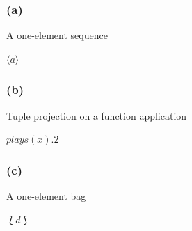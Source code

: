 \documentclass[a4paper,10pt,fleqn]{article}
\begin{document}
\subsubsection*{(a)}

\noindent A one-element sequence

\bigskip

\noindent
$\langle a \rangle$


\medskip

\subsubsection*{(b)}

\noindent Tuple projection on a function application

\bigskip

\noindent
$plays(x).2$


\medskip

\subsubsection*{(c)}

\noindent A one-element bag

\bigskip

\noindent
$\lbag d \rbag$
\end{document}
